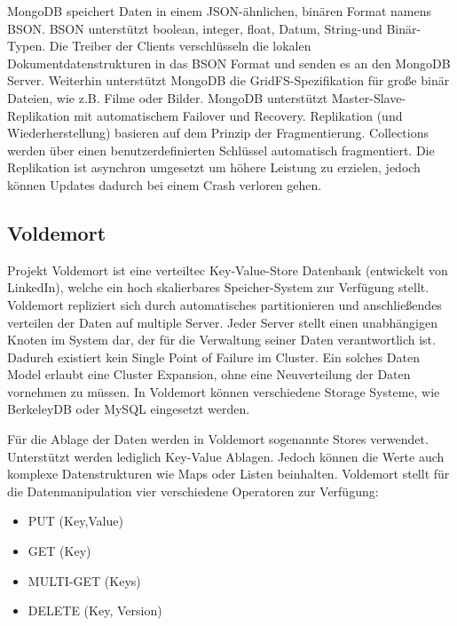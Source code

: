 MongoDB speichert Daten in einem JSON-ähnlichen, binären Format namens BSON. BSON unterstützt boolean, integer, float, Datum, String-und Binär-Typen. Die Treiber der Clients verschlüsseln die lokalen Dokumentdatenstrukturen in das BSON Format und senden es an den MongoDB Server. Weiterhin unterstützt MongoDB die GridFS-Spezifikation für große binär Dateien, wie z.B. Filme oder Bilder. MongoDB unterstützt Master-Slave-Replikation mit automatischem Failover und Recovery. Replikation (und Wiederherstellung) basieren auf dem Prinzip der Fragmentierung. Collections werden über einen benutzerdefinierten Schlüssel automatisch fragmentiert. Die Replikation ist asynchron umgesetzt um höhere Leistung zu erzielen, jedoch können Updates dadurch bei einem Crash verloren gehen. 

\subsection{Voldemort}
\label{ch:AnalyseDatenbanken:sec:Datenbanken:subsec:Voldemort}

Projekt Voldemort \cite{vod2013} ist eine verteiltec Key-Value-Store Datenbank (entwickelt von LinkedIn), welche ein hoch skalierbares Speicher-System zur Verfügung stellt. Voldemort repliziert sich durch automatisches partitionieren und anschließendes verteilen der Daten auf multiple Server. Jeder Server stellt einen unabhängigen Knoten im System dar, der für die Verwaltung seiner Daten verantwortlich ist. Dadurch existiert kein Single Point of Failure im Cluster. Ein solches Daten Model erlaubt eine Cluster Expansion, ohne eine Neuverteilung der Daten vornehmen zu müssen. In Voldemort können verschiedene Storage Systeme, wie BerkeleyDB oder MySQL eingesetzt werden. 

Für die Ablage der Daten werden in Voldemort sogenannte Stores verwendet. Unterstützt werden lediglich Key-Value Ablagen. Jedoch können die Werte auch komplexe Datenstrukturen wie Maps oder Listen beinhalten. Voldemort stellt für die Datenmanipulation vier verschiedene Operatoren zur Verfügung:

\begin{itemize}

	\item PUT (Key,Value)
	\item GET (Key)
	\item MULTI-GET (Keys)
	\item DELETE (Key, Version) 

\end{itemize}

